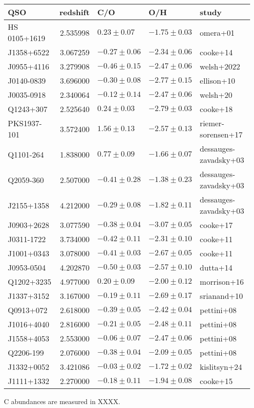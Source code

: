 \documentclass[11pt]{article}
\begin{document}
\begin{table}
\centering
\begin{tabular}{lrlll}
\hline
QSO & redshift & C/O & O/H & study \\
\hline
HS 0105+1619 & 2.535998 & $0.23 \pm 0.07$ & $-1.75 \pm 0.03$ & omera+01 \\
J1358+6522 & 3.067259 & $-0.27 \pm 0.06$ & $-2.34 \pm 0.06$ & cooke+14 \\
J0955+4116 & 3.279908 & $-0.46 \pm 0.15$ & $-2.47 \pm 0.06$ & welsh+2022 \\
J0140-0839 & 3.696000 & $-0.30 \pm 0.08$ & $-2.77 \pm 0.15$ & ellison+10 \\
J0035-0918 & 2.340064 & $-0.12 \pm 0.14$ & $-2.47 \pm 0.06$ & welsh+20 \\
Q1243+307 & 2.525640 & $0.24 \pm 0.03$ & $-2.79 \pm 0.03$ & cooke+18 \\
PKS1937-101 & 3.572400 & $1.56 \pm 0.13$ & $-2.57 \pm 0.13$ & riemer-sorensen+17 \\
Q1101-264 & 1.838000 & $0.77 \pm 0.09$ & $-1.66 \pm 0.07$ & dessauges-zavadsky+03 \\
Q2059-360 & 2.507000 & $-0.41 \pm 0.28$ & $-1.38 \pm 0.23$ & dessauges-zavadsky+03 \\
J2155+1358 & 4.212000 & $-0.29 \pm 0.08$ & $-1.82 \pm 0.11$ & dessauges-zavadsky+03 \\
J0903+2628 & 3.077590 & $-0.38 \pm 0.04$ & $-3.07 \pm 0.05$ & cooke+17 \\
J0311-1722 & 3.734000 & $-0.42 \pm 0.11$ & $-2.31 \pm 0.10$ & cooke+11 \\
J1001+0343 & 3.078000 & $-0.41 \pm 0.03$ & $-2.67 \pm 0.05$ & cooke+11 \\
J0953-0504 & 4.202870 & $-0.50 \pm 0.03$ & $-2.57 \pm 0.10$ & dutta+14 \\
Q1202+3235 & 4.977000 & $0.20 \pm 0.09$ & $-2.00 \pm 0.12$ & morrison+16 \\
J1337+3152 & 3.167000 & $-0.19 \pm 0.11$ & $-2.69 \pm 0.17$ & srianand+10 \\
Q0913+072 & 2.618000 & $-0.39 \pm 0.05$ & $-2.42 \pm 0.04$ & pettini+08 \\
J1016+4040 & 2.816000 & $-0.21 \pm 0.05$ & $-2.48 \pm 0.11$ & pettini+08 \\
J1558+4053 & 2.553000 & $-0.06 \pm 0.07$ & $-2.47 \pm 0.06$ & pettini+08 \\
Q2206-199 & 2.076000 & $-0.38 \pm 0.04$ & $-2.09 \pm 0.05$ & pettini+08 \\
J1332+0052 & 3.421086 & $-0.03 \pm 0.02$ & $-1.72 \pm 0.02$ & kislitsyn+24 \\
J1111+1332 & 2.270000 & $-0.18 \pm 0.11$ & $-1.94 \pm 0.08$ & cooke+15 \\
\hline
\end{tabular}
\end{table}
C abundances are measured in XXXX.
\end{document}
